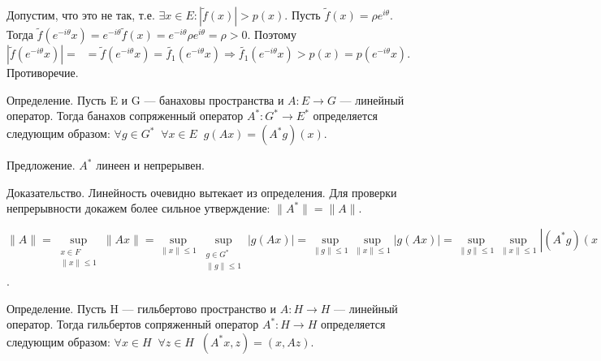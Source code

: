 \documentclass[12pt,titlepage, a4paper]{article}
\begin{document}
Допустим, что это не так, т.е. $\exists x\in E:
|\tilde{f}(x)|>p(x)$. Пусть $\tilde{f}(x)=\rho e^{i\theta}$. Тогда
$\tilde{f}(e^{-i\theta}x)=e^{-i\theta}\tilde{f}(x)=e^{-i\theta}\rho
e^{i\theta}=\rho>0$. Поэтому
$|\tilde{f}(e^{-i\theta}x)|=\;\;=\tilde{f}(e^{-i\theta}x)=\tilde{f_1}(e^{-i\theta}x)\Rightarrow
\tilde{f_1}(e^{-i\theta}x)>p(x)=p(e^{-i\theta}x)$. Противоречие.

Определение. Пусть E и G --- банаховы пространства и $A\colon
E\rightarrow G$ --- линейный оператор. Тогда банахов сопряженный
оператор $A^*\colon G^*\rightarrow E^*$ определяется следующим
образом: $\forall g\in G^* \;\;\forall x\in E
\;\;g(Ax)=(A^*g)(x)$.

Предложение. $A^*$ линеен и непрерывен.

Доказательство. Линейность очевидно вытекает из определения. Для
проверки непрерывности докажем более сильное утверждение:
$\|A^*\|=\|A\|$.

$\|A\|=\sup\limits_{\substack{x\in F\\ \|x\|\leqslant
1}}\|Ax\|=\sup\limits_{\|x\|\leqslant
1}\sup\limits_{\substack{g\in G^*\\ \|g\|\leqslant
1}}|g(Ax)|=\sup\limits_{\|g\|\leqslant
1}\sup\limits_{\|x\|\leqslant
1}|g(Ax)|=\sup\limits_{\|g\|\leqslant
1}\sup\limits_{\|x\|\leqslant
1}|(A^*g)(x)|=\;=\sup\limits_{\|g\|\leqslant 1}\|A^*g\|=\|A^*\|$.

Определение. Пусть H --- гильбертово пространство и $A\colon
H\rightarrow H$ --- линейный оператор. Тогда гильбертов
сопряженный оператор $A^*\colon H\rightarrow H$ определяется
следующим образом: $\forall x\in H \;\;\forall z\in H
\;\;(A^*x,z)=(x,Az)$.
\end{document}
